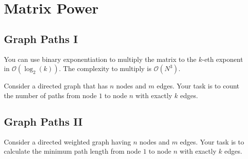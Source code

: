     \section{Matrix Power}
    \subsection{Graph Paths I}
    You can use binary exponentiation to multiply the matrix to the $k$-eth exponent in $\mathcal{O}(\log_2(k))$. The complexity to multiply is $\mathcal{O}(N^3)$.
    
    Consider a directed graph that has $n$ nodes and $m$ edges. Your task is to count the number of paths from node $1$ to node $n$ with exactly $k$ edges.
    
    \subsection{Graph Paths II}
    Consider a directed weighted graph having $n$ nodes and $m$ edges. Your task is to calculate the minimum path length from node $1$ to node $n$ with exactly $k$ edges.

